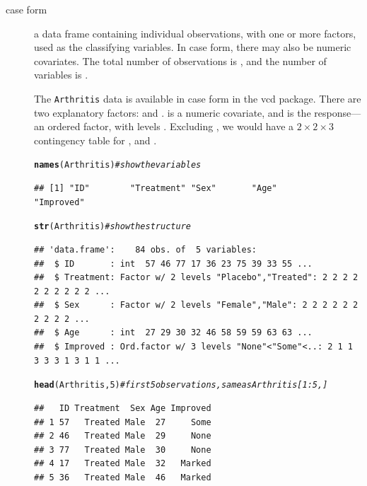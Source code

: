 \documentclass[10pt,twoside]{article}\usepackage[]{graphicx}\usepackage[]{color}
\makeatletter
\newcommand{\hlnum}[1]{\textcolor[rgb]{0.686,0.059,0.569}{#1}}%
\newcommand{\hlcom}[1]{\textcolor[rgb]{0.678,0.584,0.686}{\textit{#1}}}%
\newcommand{\hlstd}[1]{\textcolor[rgb]{0.345,0.345,0.345}{#1}}%
\newcommand{\hlkwd}[1]{\textcolor[rgb]{0.737,0.353,0.396}{\textbf{#1}}}%
\newenvironment{kframe}{%
 \def\at@end@of@kframe{}%
 \ifinner\ifhmode%
  \def\at@end@of@kframe{\end{minipage}}%
  \begin{minipage}{\columnwidth}%
 \fi\fi%
 \def\FrameCommand##1{\hskip\@totalleftmargin \hskip-\fboxsep
 \colorbox{shadecolor}{##1}\hskip-\fboxsep
     \hskip-\linewidth \hskip-\@totalleftmargin \hskip\columnwidth}%
 \MakeFramed {\advance\hsize-\width
   \@totalleftmargin\z@ \linewidth\hsize
   \@setminipage}}%
 {\par\unskip\endMakeFramed%
 \at@end@of@kframe}
\newenvironment{knitrout}{}{} %
\newcommand*{\Example}{\fbox{\textbf{\emph{Example}}:} }
\newcommand{\data}[1]{\texttt{#1}}
\newcommand{\pkg}[1]{{\normalfont\fontseries{b}\selectfont #1}}
\makeatother
\begin{document}
\begin{description}
  \item[case form] a data frame containing individual observations, with one or
  more factors, used as the classifying variables. In case form, there may also
  be numeric covariates. 
  The total number of observations
  is , and the number of variables is .
  	
\Example
The \data{Arthritis} data is available in case form in the \pkg{vcd} package. 
There are two explanatory factors:  and . 
is a numeric covariate, and  is the response--- an ordered factor,
with levels 
.  
Excluding , we would have
a $2 \times 2 \times 3$ contingency table for ,  and .
\begin{knitrout}
\color{fgcolor}\begin{kframe}
\begin{alltt}
\hlkwd{names}\hlstd{(Arthritis)}      \hlcom{# show the variables}
\end{alltt}
\begin{verbatim}
## [1] "ID"        "Treatment" "Sex"       "Age"       "Improved"
\end{verbatim}
\begin{alltt}
\hlkwd{str}\hlstd{(Arthritis)}        \hlcom{# show the structure}
\end{alltt}
\begin{verbatim}
## 'data.frame':	84 obs. of  5 variables:
##  $ ID       : int  57 46 77 17 36 23 75 39 33 55 ...
##  $ Treatment: Factor w/ 2 levels "Placebo","Treated": 2 2 2 2 2 2 2 2 2 2 ...
##  $ Sex      : Factor w/ 2 levels "Female","Male": 2 2 2 2 2 2 2 2 2 2 ...
##  $ Age      : int  27 29 30 32 46 58 59 59 63 63 ...
##  $ Improved : Ord.factor w/ 3 levels "None"<"Some"<..: 2 1 1 3 3 3 1 3 1 1 ...
\end{verbatim}
\begin{alltt}
\hlkwd{head}\hlstd{(Arthritis,}\hlnum{5}\hlstd{)}     \hlcom{# first 5 observations, same as Arthritis[1:5,] }
\end{alltt}
\begin{verbatim}
##   ID Treatment  Sex Age Improved
## 1 57   Treated Male  27     Some
## 2 46   Treated Male  29     None
## 3 77   Treated Male  30     None
## 4 17   Treated Male  32   Marked
## 5 36   Treated Male  46   Marked
\end{verbatim}
\end{kframe}
\end{knitrout}


\end{description}
\end{document}
